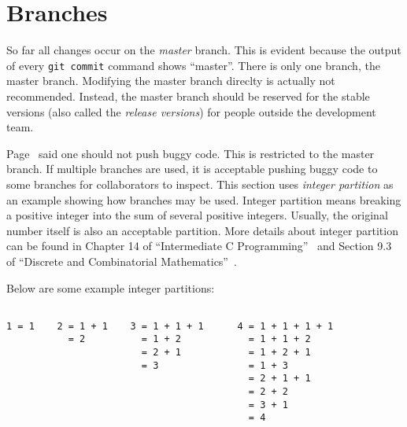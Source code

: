 \section{Branches}
\label{section:git:branches}

So far all changes occur on the {\it master} branch. This is evident
because the output of every {\tt git commit} command shows ``master''.
There is only one branch, the master branch.  Modifying the master
branch direclty is actually not recommended. Instead, the master
branch should be reserved for the stable versions (also called the
{\it release versions}) for people outside the development team.

 Page~\pageref{page:whengitpush} said one
should not push buggy code. This is restricted to the master branch.
If multiple branches are used, it is acceptable pushing buggy code to
some branches for collaborators to inspect.  This section uses {\it
  integer partition} as an example showing how branches may be
used. Integer partition means breaking a positive integer into the sum
of several positive integers. Usually, the original number itself is
also an acceptable partition. More details about integer partition can
be found in Chapter 14 of ``Intermediate C
Programming''~\cite{Lu2015IntermediateCProgramming} and Section 9.3 of
``Discrete and Combinatorial
Mathematics''~\cite{Grimaldi2003DiscreteandCombinatorial}.


Below are some example integer partitions:

\begin{verbatim}

1 = 1    2 = 1 + 1    3 = 1 + 1 + 1      4 = 1 + 1 + 1 + 1
           = 2          = 1 + 2            = 1 + 1 + 2
                        = 2 + 1            = 1 + 2 + 1
                        = 3                = 1 + 3
                                           = 2 + 1 + 1
                                           = 2 + 2
                                           = 3 + 1
                                           = 4
\end{verbatim}


